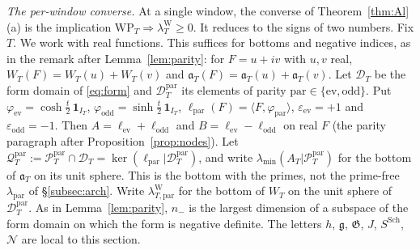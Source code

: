 \documentclass[11pt]{amsart}
\theoremstyle{definition}
\theoremstyle{remark}
\newcommand{\PT}{\mathcal P_T}
\newcommand{\IT}{I_T}
\newcommand{\lamW}{\lambda^{\mathrm W}_T}
\begin{document}
\emph{The per-window converse.} At a single window, the converse of Theorem~\ref{thm:Al}(a) is the
implication $\mathrm{WP}_T\Rightarrow\lamW\ge0$. It reduces to the signs of two numbers. Fix $T$. We work
with real functions. This suffices for bottoms and negative indices, as in the remark after
Lemma~\ref{lem:parity}: for $F=u+iv$ with $u,v$ real, $W_T(F)=W_T(u)+W_T(v)$ and
$\mathfrak a_T(F)=\mathfrak a_T(u)+\mathfrak a_T(v)$. Let $\mathcal D_T$ be the form domain of \eqref{eq:form}
and $\mathcal D^{\mathrm{par}}_T$ its elements of parity $\mathrm{par}\in\{\mathrm{ev},\mathrm{odd}\}$. Put
$\varphi_{\mathrm{ev}}=\cosh\frac t2\,\mathbf 1_{\IT}$, $\varphi_{\mathrm{odd}}=\sinh\frac t2\,\mathbf 1_{\IT}$,
$\ell_{\mathrm{par}}(F)=\langle F,\varphi_{\mathrm{par}}\rangle$, $\varepsilon_{\mathrm{ev}}=+1$ and
$\varepsilon_{\mathrm{odd}}=-1$. Then $A=\ell_{\mathrm{ev}}+\ell_{\mathrm{odd}}$ and
$B=\ell_{\mathrm{ev}}-\ell_{\mathrm{odd}}$ on real $F$ (the parity paragraph after
Proposition~\ref{prop:nodes}). Let $\mathcal Q^{\mathrm{par}}_T:=\PT^{\mathrm{par}}\cap\mathcal D_T
=\ker(\ell_{\mathrm{par}}|\mathcal D^{\mathrm{par}}_T)$, and write $\lambda_{\min}(A_T|\PT^{\mathrm{par}})$ for the
bottom of $\mathfrak a_T$ on its unit sphere. This is the bottom with the primes, not the prime-free
$\lambda_{\mathrm{par}}$ of \S\ref{subsec:arch}. Write $\lambda^{\mathrm W}_{T,\mathrm{par}}$ for the bottom of
$W_T$ on the unit sphere of $\mathcal D^{\mathrm{par}}_T$. As in Lemma~\ref{lem:parity}, $n_-$ is the largest
dimension of a subspace of the form domain on which the form is negative definite. The letters $h$,
$\mathfrak g$, $\mathfrak G$, $J$, $S^{\mathrm{Sch}}$, $\mathcal N$ are local to this section.
\end{document}

